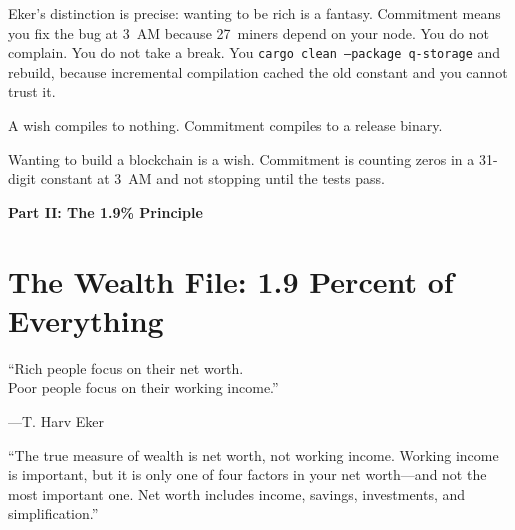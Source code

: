 \documentclass[11pt,a4paper]{article}
\begin{document}
\vspace{0.3cm}

Eker's distinction is precise: wanting to be rich is a fantasy.
Commitment means you fix the bug at 3~AM because 27~miners depend on
your node. You do not complain. You do not take a break. You
\texttt{cargo clean --package q-storage} and rebuild, because
incremental compilation cached the old constant and you cannot trust it.

A wish compiles to nothing. Commitment compiles to a release binary.

\begin{principle}[title={\textbf{The Principle}}]
Wanting to build a blockchain is a wish. Commitment is counting zeros
in a 31-digit constant at 3~AM and not stopping until the tests pass.
\end{principle}


\newpage
\begin{center}
{\LARGE\bfseries\color{wealthgold!80!black} Part II: The 1.9\% Principle}\\[0.3cm]
\end{center}
\vspace{0.5cm}


\section{The Wealth File: 1.9 Percent of Everything}

\epigraph{``Rich people focus on their net worth.\\
Poor people focus on their working income.''}%
{---T. Harv Eker}

\begin{wealthbox}[title={\raisebox{-0.5pt}{\tiny$\bigstar$} Wealth File \#4}]
``The true measure of wealth is net worth, not working income.
Working income is important, but it is only one of four factors in
your net worth---and not the most important one. Net worth includes
income, savings, investments, and simplification.''
\end{wealthbox}
\end{document}
